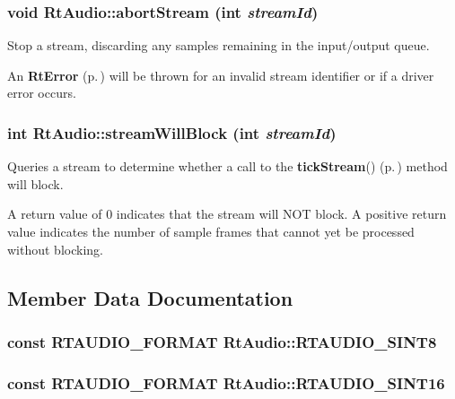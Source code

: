 \subsubsection{\setlength{\rightskip}{0pt plus 5cm}void Rt\-Audio::abort\-Stream (int {\em stream\-Id})}\label{classRtAudio_a13}


Stop a stream, discarding any samples remaining in the input/output queue.

An {\bf Rt\-Error} {\rm (p.\,\pageref{classRtError})} will be thrown for an invalid stream identifier or if a driver error occurs. 
\subsubsection{\setlength{\rightskip}{0pt plus 5cm}int Rt\-Audio::stream\-Will\-Block (int {\em stream\-Id})}\label{classRtAudio_a14}


Queries a stream to determine whether a call to the {\bf tick\-Stream}() {\rm (p.\,\pageref{classRtAudio_a9})} method will block.

A return value of 0 indicates that the stream will NOT block. A positive return value indicates the number of sample frames that cannot yet be processed without blocking. 

\subsection{Member Data Documentation}
\subsubsection{\setlength{\rightskip}{0pt plus 5cm}const {\bf RTAUDIO\_\-FORMAT} Rt\-Audio::RTAUDIO\_\-SINT8\hspace{0.3cm}{\tt  [static]}}\label{classRtAudio_p0}


\subsubsection{\setlength{\rightskip}{0pt plus 5cm}const {\bf RTAUDIO\_\-FORMAT} Rt\-Audio::RTAUDIO\_\-SINT16\hspace{0.3cm}{\tt  [static]}}\label{classRtAudio_p1}


